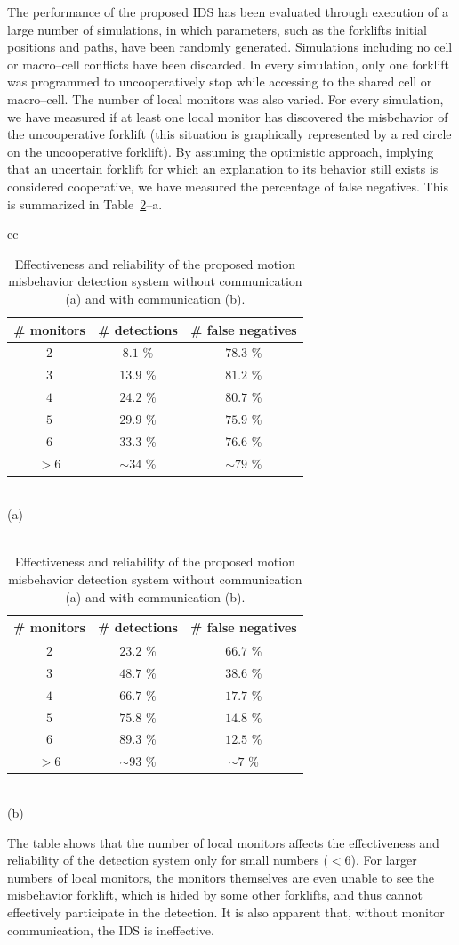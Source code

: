 \documentclass[journal, onecolumn, 12pt]{styles/IEEEtran}
\begin{document}
The performance of the proposed IDS has been evaluated through execution of a large number of simulations, in which parameters, such as the forklifts initial positions and paths, have been randomly generated. Simulations including no cell or macro--cell conflicts have been discarded. In every simulation, only one forklift was programmed to uncooperatively stop while accessing to the shared cell or macro--cell. The number of local monitors was also varied. For every simulation, we have measured if at least one local monitor has discovered the misbehavior of the uncooperative forklift (this situation is graphically represented by a red circle on the uncooperative forklift). By assuming the optimistic approach, implying that an uncertain forklift for which an explanation to its behavior still exists is considered cooperative, we have measured the percentage of false negatives. This is summarized in Table~\ref{table-performance}--a.
\begin{table}
\centering
\begin{tabular}{cc}
\begin{tabular}{|| c || c | c ||}
\hline
\# monitors & \# detections & \# false negatives \\
\hline
$2$ & $8.1$  \%	& $78.3$  \%\\
$3$	& $13.9$  \%&	$81.2$  \%\\
$4$	& $24.2$  \%&	$80.7$  \%\\
$5$	& $29.9$  \%&	$75.9$  \%\\
$6$	& $33.3$  \%&	$76.6$  \%\\
$>6$ & $\sim 34$  \%& $\sim79$ \% \\
\hline
\end{tabular}
\\
(a)
\\
\\
\begin{tabular}{|| c || c | c ||}
\hline
\# monitors & \# detections & \# false negatives \\
\hline
$2$ & $23.2$  \%	& $66.7$  \%\\
$3$	& $48.7$  \% &	$38.6$  \%\\
$4$	& $66.7$  \%&	$17.7$  \%\\
$5$	& $75.8$  \%&	$14.8$  \%\\
$6$	& $89.3$  \%&	$12.5$  \%\\
$>6$ & $\sim 93$ \% & $\sim 7$  \%\\
\hline
\end{tabular}
\\
(b) 
\end{tabular}
\caption{Effectiveness and reliability of the proposed motion misbehavior detection system without communication (a) and with communication (b).}
\label{table-performance}
\end{table}
The table shows that the number of local monitors affects the effectiveness and reliability of the detection system only for small numbers ($<6$). For larger numbers of local monitors, the monitors themselves are even unable to see the misbehavior forklift, which is hided by some other forklifts, and thus cannot effectively participate in the detection. It is also apparent that, without monitor communication, the IDS is ineffective.
\end{document}
